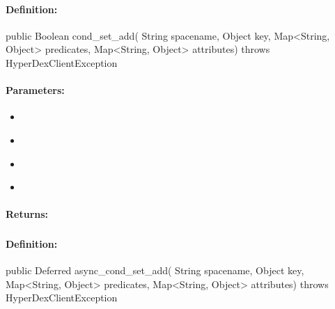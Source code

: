 \paragraph{Definition:}
\begin{javacode}
public Boolean cond_set_add(
        String spacename,
        Object key,
        Map<String, Object> predicates,
        Map<String, Object> attributes) throws HyperDexClientException
\end{javacode}

\paragraph{Parameters:}
\begin{itemize}[noitemsep]
\item {}\\

\item {}\\

\item {}\\

\item {}\\

\end{itemize}

\paragraph{Returns:}


\pagebreak
\subsubsection{}
\label{api:java:async_cond_set_add}


\paragraph{Definition:}
\begin{javacode}
public Deferred async_cond_set_add(
        String spacename,
        Object key,
        Map<String, Object> predicates,
        Map<String, Object> attributes) throws HyperDexClientException
\end{javacode}

